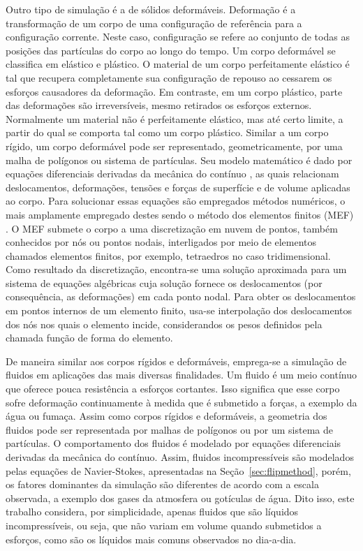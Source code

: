 \documentclass[12pt,a4paper,dvipsnames]{article}
\newcommand{\secref}[1]{Seção~\ref{#1}}
\begin{document}
Outro tipo de simulação é a de sólidos deformáveis. Deformação é a transformação de um corpo de uma configuração de referência para a configuração corrente. Neste caso, configuração se refere ao conjunto de todas as posições das partículas do corpo ao longo do tempo. Um corpo deformável se classifica em elástico e plástico. O material de um corpo perfeitamente elástico é tal que recupera completamente sua configuração de repouso ao cessarem os esforços causadores da deformação. Em contraste, em um corpo plástico, parte das deformações são irreversíveis, mesmo retirados os esforços externos. Normalmente um material não é perfeitamente elástico, mas até certo limite, a partir do qual se comporta tal como um corpo plástico. Similar a um corpo rígido, um corpo deformável pode ser representado, geometricamente, por uma malha de polígonos ou sistema de partículas. Seu modelo matemático é dado por equações diferenciais derivadas da mecânica do contínuo \cite{malvern1969introduction}, as quais relacionam deslocamentos, deformações, tensões e forças de superfície e de volume aplicadas ao corpo. Para solucionar essas equações são empregados métodos numéricos, o mais amplamente empregado destes sendo o método dos elementos finitos (MEF) \cite{MEF}. O MEF submete o corpo a uma discretização em nuvem de pontos, também conhecidos por nós ou pontos nodais, interligados por meio de elementos chamados elementos finitos, por exemplo, tetraedros no caso tridimensional. Como resultado da discretização, encontra-se uma solução aproximada para um sistema de equações algébricas cuja solução fornece os deslocamentos (por consequência, as deformações) em cada ponto nodal. Para obter os deslocamentos em pontos internos de um elemento finito, usa-se interpolação dos deslocamentos dos nós nos quais o elemento incide, considerandos os pesos definidos pela chamada função de forma do elemento.

De maneira similar aos corpos rígidos e deformáveis, emprega-se a simulação de fluidos em aplicações das mais diversas finalidades. Um fluido é um meio contínuo que oferece pouca resistência a esforços cortantes. Isso significa que esse corpo sofre deformação continuamente à medida que é submetido a forças, a exemplo da água ou fumaça. Assim como corpos rígidos e deformáveis, a geometria dos fluidos pode ser representada por malhas de polígonos ou por um sistema de partículas. O comportamento dos fluidos é modelado por equações diferenciais derivadas da mecânica do contínuo. Assim, fluidos incompressíveis são modelados pelas equações de Navier-Stokes, apresentadas na \secref{sec:flipmethod}, porém, os fatores dominantes da simulação são diferentes de acordo com a escala observada, a exemplo dos gases da atmosfera ou gotículas de água. Dito isso, este trabalho considera, por simplicidade, apenas fluidos que são líquidos incompressíveis, ou seja, que não variam em volume quando submetidos a esforços, como são os líquidos mais comuns observados no dia-a-dia.
\end{document}
